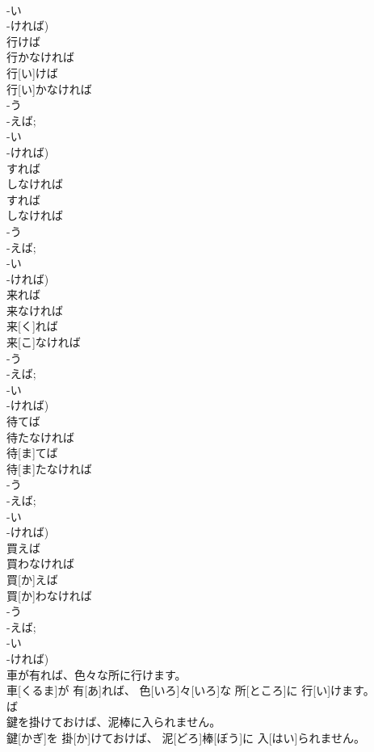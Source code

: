 \documentclass[8pt]{extreport}
\begin{document}
\begin{CJK}{UTF8}{min}
\\	-い 
\\	-ければ)
\\	行けば 
\\	行かなければ	
\\	行[い]けば 
\\	行[い]かなければ 
\\	-う 
\\	-えば; 
\\	-い 
\\	-ければ)
\\	すれば 
\\	しなければ	
\\	すれば 
\\	しなければ 
\\	-う 
\\	-えば; 
\\	-い 
\\	-ければ)
\\	来れば 
\\	来なければ	
\\	来[く]れば 
\\	来[こ]なければ 
\\	-う 
\\	-えば; 
\\	-い 
\\	-ければ)
\\	待てば 
\\	待たなければ	
\\	待[ま]てば 
\\	待[ま]たなければ 
\\	-う 
\\	-えば; 
\\	-い 
\\	-ければ)
\\	買えば 
\\	買わなければ	
\\	買[か]えば 
\\	買[か]わなければ 
\\	-う 
\\	-えば; 
\\	-い 
\\	-ければ)
\\	車が有れば、色々な所に行けます。	
\\	車[くるま]が 有[あ]れば、 色[いろ]々[いろ]な 所[ところ]に 行[い]けます。 
\\	ば 
\\	鍵を掛けておけば、泥棒に入られません。	
\\	鍵[かぎ]を 掛[か]けておけば、 泥[どろ]棒[ぼう]に 入[はい]られません。 

\end{CJK}
\end{document}
